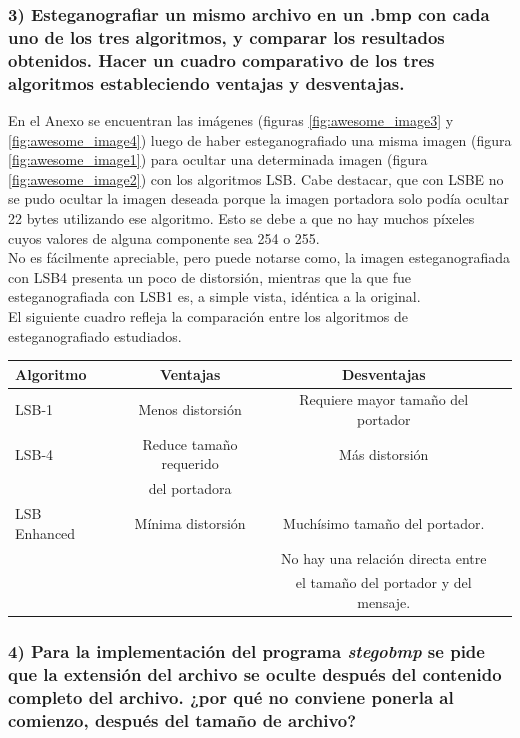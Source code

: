 \documentclass[a4paper,10pt]{article}
\begin{document}
\subsubsection*{ 3) Esteganografiar un mismo archivo en un .bmp con cada uno de los tres algoritmos, y comparar
los resultados obtenidos. Hacer un cuadro comparativo de los tres algoritmos estableciendo ventajas y desventajas.}

En el Anexo se encuentran las imágenes (figuras \ref{fig:awesome_image3} y \ref{fig:awesome_image4}) luego de haber esteganografiado una misma imagen (figura \ref{fig:awesome_image1}) 
para ocultar una determinada imagen (figura \ref{fig:awesome_image2})
con los algoritmos LSB. Cabe destacar, que con LSBE no se pudo ocultar la imagen deseada porque la imagen portadora solo podía ocultar 22 bytes utilizando ese algoritmo. Esto se debe a que no hay muchos píxeles cuyos valores de alguna 
componente sea 254 o 255.\\

No es fácilmente apreciable, pero puede notarse como, la imagen esteganografiada con LSB4 presenta un poco de distorsión, mientras que la que fue esteganografiada con LSB1 es, a simple
vista, idéntica a la original.\\

El siguiente cuadro refleja la comparación entre los algoritmos de esteganografiado estudiados.\\

\begin{tabular}[\baselineskip]{|l|c|c|c}
    \hline
    Algoritmo & Ventajas & Desventajas \\
    \hline
    LSB-1 &  Menos distorsión & Requiere mayor tamaño del portador \\
    \hline
    LSB-4       & Reduce tamaño requerido       & Más distorsión \\
                &  del portadora                & \\
    \hline
    LSB Enhanced & Mínima distorsión    & Muchísimo tamaño del portador.\\
                 &                      & No hay una relación directa entre \\
                 &                      & el tamaño del portador y del mensaje.\\
    \hline
\end{tabular} 


\subsubsection*{ 4) Para la implementación del programa \textit{stegobmp} se pide que la extensión del archivo se oculte
después del contenido completo del archivo. ¿por qué no conviene ponerla al comienzo, después del tamaño de archivo?}
\end{document}
